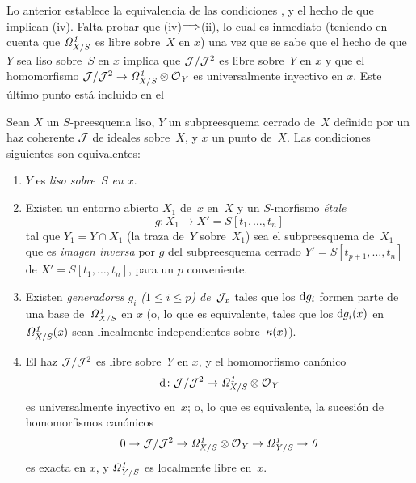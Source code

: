 Lo anterior establece la equivalencia de las condiciones
,
y el hecho de que implican (iv). Falta probar que (iv)$\To$(ii), lo cual es inmediato (teniendo en cuenta que $\it{\Omega}^1_{X/S}$ es libre sobre~$X$ en $x$) una vez que se sabe que el hecho de que $Y$ sea liso sobre~$S$ en $x$ implica que $\cal{J}/\cal{J}^2$ es libre sobre~$Y$ en $x$ y que el homomorfismo $\cal{J}/\cal{J}^2\to\it{\Omega}^1_{X/S}\otimes\cal{O}_Y$ es universalmente inyectivo en $x$. Este último punto está incluido en el

\begin{theoreme}
\label{II.4.10}
Sean $X$ un $S$-preesquema liso, $Y$ un subpreesquema cerrado de~$X$ definido por un haz coherente $\cal{J}$ de ideales sobre~$X$, y $x$ un punto de~$X$. Las condiciones siguientes son equivalentes:
\begin{enumerate}
\item[(i)] $Y$ es \emph{liso sobre~$S$ en $x$}.
\item[(ii)] Existen un entorno abierto $X_1$ de~$x$ en~$X$ y un $S$-morfismo \emph{étale}
\[
g\colon X_1\to X'=S[t_1,\dots,t_n]
\]
tal que $Y_1=Y\cap X_1$ (la traza de~$Y$ sobre~$X_1$) sea el subpreesquema de~$X_1$ que es \emph{imagen inversa} por $g$ del subpreesquema cerrado $Y'=S[t_{p+1},\dots,t_n]$ de $X'=S[t_1,\dots,t_n]$, para un $p$ conveniente.
\item[(iii)] Existen \emph{generadores $g_i$ ($1\leq i\leq p$) de~$\cal{J}_x$} tales que los $\rd g_i$ formen parte de una base de~$\it{\Omega}^1_{X/S}$ en $x$ (o, lo que es equivalente, tales que los $\rd g_i(x)$ en $\it{\Omega}^1_{X/S}(x)$ sean linealmente independientes sobre~$\kres(x)$).
\item[(iv)] El haz $\cal{J}/\cal{J}^2$ es libre sobre~$Y$ en $x$, y el homomorfismo canónico
\[
\rd\colon\cal{J}/\cal{J}^2\to\it{\Omega}^1_{X/S}\otimes\cal{O}_Y
\]
es universalmente inyectivo en~$x$; o, lo que es equivalente, la sucesión de homomorfismos canónicos
\[
0\to\cal{J}/\cal{J}^2\to\it{\Omega}^1_{X/S}\otimes\cal{O}_Y\to
\it{\Omega}^1_{Y/S}\to 0
\]
es exacta en $x$, y $\it{\Omega}^1_{Y/S}$ es localmente libre en~$x$.
\end{enumerate}
\end{theoreme}


